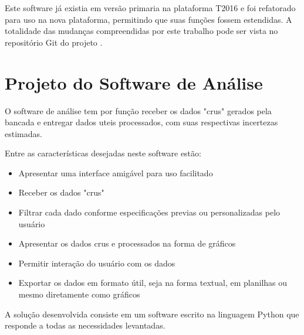 Este software já existia em versão primaria na plataforma T2016 e foi refatorado para uso na nova plataforma, permitindo que suas funções fossem estendidas. A totalidade das mudanças compreendidas por este trabalho pode ser vista no repositório Git do projeto \cite{vivace_2018}.

\section{Projeto do Software de Análise}

O software de análise tem por função receber os dados "crus" gerados pela bancada e entregar dados uteis processados, com suas respectivas incertezas estimadas.

Entre as características desejadas neste software estão:

\begin{itemize}
    \item Apresentar uma interface amigável para uso facilitado
    \item Receber os dados "crus"
    \item Filtrar cada dado conforme especificações previas ou personalizadas pelo usuário
    \item Apresentar os dados crus e processados na forma de gráficos
    \item Permitir interação do usuário com os dados
    \item Exportar os dados em formato útil, seja na forma textual, em planilhas ou mesmo diretamente como gráficos
\end{itemize}

A solução desenvolvida consiste em um software escrito na linguagem Python que responde a todas as necessidades levantadas. 


